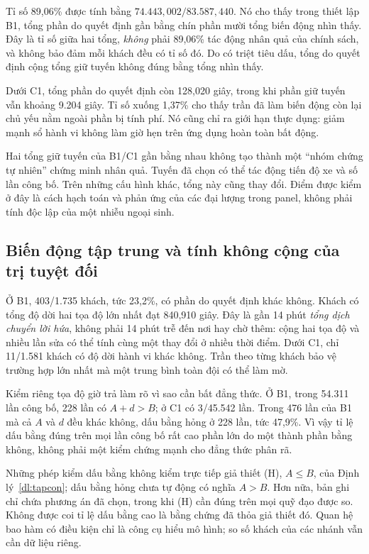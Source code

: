 Tỉ số 89,06\% được tính bằng $74.443{,}002/83.587{,}440$. Nó cho thấy trong thiết lập
B1, tổng phần do quyết định gần bằng chín phần mười tổng biến động nhìn thấy. Đây là tỉ
số giữa hai tổng, \emph{không} phải 89,06\% tác động nhân quả của chính sách, và không
bảo đảm mỗi khách đều có tỉ số đó. Do có triệt tiêu dấu, tổng do quyết định cộng tổng giữ
tuyến không đúng bằng tổng nhìn thấy.

Dưới C1, tổng phần do quyết định còn 128,020 giây, trong khi phần giữ tuyến vẫn khoảng
9.204 giây. Tỉ số xuống 1,37\% cho thấy trần đã làm biến động còn lại chủ yếu nằm ngoài
phần bị tính phí. Nó cũng chỉ ra giới hạn thực dụng: giảm mạnh sổ hành vi không làm giờ
hẹn trên ứng dụng hoàn toàn bất động.

Hai tổng giữ tuyến của B1/C1 gần bằng nhau không tạo thành một ``nhóm chứng tự nhiên''
chứng minh nhân quả. Tuyến đã chọn có thể tác động tiến độ xe và số lần công bố. Trên
những cấu hình khác, tổng này cũng thay đổi. Điểm được kiểm ở đây là cách hạch toán và
phản ứng của các đại lượng trong panel, không phải tính độc lập của một nhiễu ngoại sinh.

\subsection{Biến động tập trung và tính không cộng của trị tuyệt đối}

Ở B1, 403/1.735 khách, tức 23,2\%, có phần do quyết định khác không. Khách có tổng độ
dời hai tọa độ lớn nhất đạt 840,910 giây. Đây là gần 14 phút \emph{tổng dịch chuyển lời
hứa}, không phải 14 phút trễ đến nơi hay chờ thêm: cộng hai tọa độ và nhiều lần sửa có
thể tính cùng một thay đổi ở nhiều thời điểm. Dưới C1, chỉ 11/1.581 khách có độ dời hành
vi khác không. Trần theo từng khách bảo vệ trường hợp lớn nhất mà một trung bình toàn
đội có thể làm mờ.

Kiểm riêng tọa độ giờ trả làm rõ vì sao cần bất đẳng thức. Ở B1, trong 54.311 lần công
bố, 228 lần có $A+d>B$; ở C1 có 3/45.542 lần. Trong 476 lần của B1 mà cả $A$ và $d$
đều khác không, dấu bằng hỏng ở 228 lần, tức 47,9\%. Vì vậy tỉ lệ dấu bằng đúng trên
mọi lần công bố rất cao phần lớn do một thành phần bằng không, không phải một kiểm
chứng mạnh cho đẳng thức phân rã.

Những phép kiểm dấu bằng không kiểm trực tiếp giả thiết (H), $A\le B$, của Định
lý~\ref{dl:tapcon}; dấu bằng hỏng chưa tự động có nghĩa $A>B$. Hơn nữa, bản ghi chỉ
chứa phương án đã chọn, trong khi (H) cần đúng trên mọi quỹ đạo được so. Không được
coi tỉ lệ dấu bằng cao là bằng chứng đã thỏa giả thiết đó. Quan hệ bao hàm có điều
kiện chỉ là công cụ hiểu mô hình; so số khách của các nhánh vẫn cần dữ liệu riêng.

